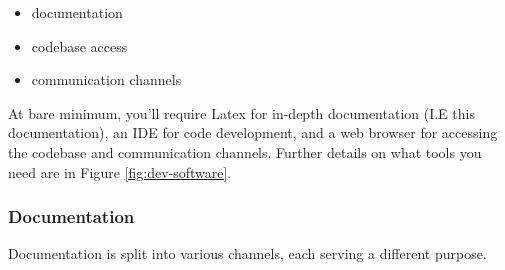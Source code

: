 \begin{itemize}
    \item documentation
    \item codebase access
    \item communication channels
\end{itemize}

At bare minimum, you'll require Latex for in-depth documentation (I.E this documentation), an IDE for code development, and a web browser for accessing the codebase and communication channels. 
Further details on what tools you need are in Figure \ref{fig:dev-software}.

\subsubsection{Documentation}
Documentation is split into various channels, each serving a different purpose.

